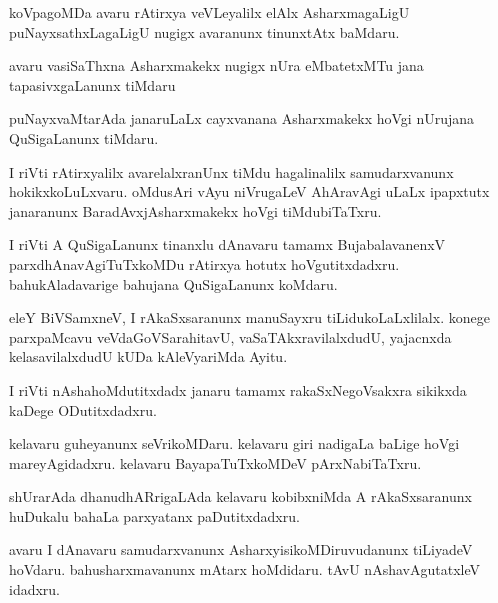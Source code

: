 \documentclass{article}
\begin{document}
\begin{mn}
koVpagoMDa  avaru  rAtirxya  veVLeyalilx  elAlx  AsharxmagaLigU  puNayxsathxLagaLigU  
nugigx  avaranunx  tinunxtAtx  baMdaru.
\end{mn}

\begin{mn}
avaru  vasiSaThxna  Asharxmakekx  nugigx  nUra  eMbatetxMTu  jana  tapasivxgaLanunx  tiMdaru
\end{mn}

\begin{mn}
puNayxvaMtarAda  janaruLaLx  cayxvanana  Asharxmakekx  hoVgi  nUrujana  QuSigaLanunx  tiMdaru.
\end{mn}

\begin{mn}
I riVti  rAtirxyalilx  avarelalxranUnx  tiMdu  hagalinalilx  samudarxvanunx  hokikxkoLuLxvaru.  oMdusAri  
vAyu  niVrugaLeV  AhAravAgi  uLaLx ipapxtutx  janaranunx  BaradAvxjAsharxmakekx  hoVgi  tiMdubiTaTxru.
\end{mn}

\begin{mn}
I riVti  A  QuSigaLanunx  tinanxlu  dAnavaru  tamamx  BujabalavanenxV  parxdhAnavAgiTuTxkoMDu  
rAtirxya hotutx  hoVgutitxdadxru.  bahukAladavarige  bahujana  QuSigaLanunx  koMdaru.
\end{mn}

\begin{mn}
eleY  BiVSamxneV,  I  rAkaSxsaranunx  manuSayxru  tiLidukoLaLxlilalx.  konege  parxpaMcavu  
veVdaGoVSarahitavU,  vaSaTAkxravilalxdudU,  yajacnxda  kelasavilalxdudU  kUDa  kAleVyariMda  Ayitu.
\end{mn}

\begin{mn}
I riVti  nAshahoMdutitxdadx  janaru  tamamx  rakaSxNegoVsakxra  sikikxda  kaDege  ODutitxdadxru.
\end{mn}

\begin{mn}
kelavaru  guheyanunx  seVrikoMDaru.  kelavaru  giri  nadigaLa  baLige  hoVgi  mareyAgidadxru.  
kelavaru  BayapaTuTxkoMDeV  pArxNabiTaTxru.
\end{mn}

\begin{mn}
shUrarAda  dhanudhARrigaLAda  kelavaru  kobibxniMda  A  rAkaSxsaranunx  huDukalu  
bahaLa  parxyatanx paDutitxdadxru.
\end{mn}

\begin{mn}
avaru  I  dAnavaru  samudarxvanunx  AsharxyisikoMDiruvudanunx  tiLiyadeV  hoVdaru.  
bahusharxmavanunx  mAtarx  hoMdidaru.  tAvU  nAshavAgutatxleV  idadxru.
\end{mn}
\end{document}

